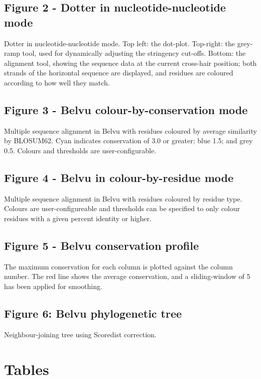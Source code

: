 \documentclass[10pt]{bmc_article}
\newenvironment{bmcformat}{\begin{raggedright}\baselineskip20pt\sloppy\setboolean{publ}{false}}{\end{raggedright}\baselineskip20pt\sloppy}
\begin{document}
\begin{bmcformat}
\subsection*{Figure 2 - Dotter in nucleotide-nucleotide mode}
Dotter in nucleotide-nucleotide mode. Top left: the dot-plot. Top-right: the grey-ramp tool, used for dynamically adjusting the stringency cut-offs. Bottom: the alignment tool, showing the sequence data at the current cross-hair position; both strands of the horizontal sequence are displayed, and residues are coloured according to how well they match.

\subsection*{Figure 3 - Belvu colour-by-conservation mode}
Multiple sequence alignment in Belvu with residues coloured by average similarity by BLOSUM62. Cyan indicates conservation of 3.0 or greater; blue 1.5; and grey 0.5. Colours and thresholds are user-configurable.

\subsection*{Figure 4 - Belvu in colour-by-residue mode}
Multiple sequence alignment in Belvu with residues coloured by residue type. Colours are user-configureable and thresholds can be specified to only colour residues with a given percent identity or higher.

\subsection*{Figure 5 - Belvu conservation profile}
The maximum conservation for each column is plotted against the column number. The red line shows the average conservation, and a sliding-window of 5 has been applied for smoothing.

\subsection*{Figure 6: Belvu phylogenetic tree}
Neighbour-joining tree using Scoredist correction.



\section*{Tables}

\end{bmcformat}
\end{document}
